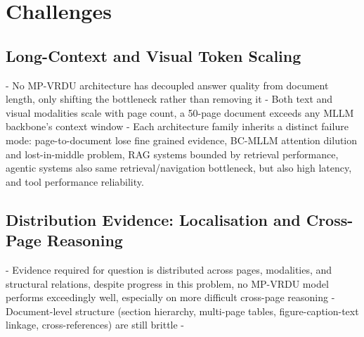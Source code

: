 \documentclass[11pt]{article}
\begin{document}





\section{Challenges}

\subsection{Long-Context and Visual Token Scaling}
- No MP-VRDU architecture has decoupled answer quality from document length, only shifting the bottleneck rather than removing it
- Both text and visual modalities scale with page count, a 50-page document exceeds any MLLM backbone's context window
- Each architecture family inherits a distinct failure mode: page-to-document lose fine grained evidence, BC-MLLM attention dilution and lost-in-middle problem, RAG systems bounded by retrieval performance, agentic systems also same retrieval/navigation bottleneck, but also high latency, and tool performance reliability.

\subsection{Distribution Evidence: Localisation and Cross-Page Reasoning}
- Evidence required for question is distributed across pages, modalities, and structural relations, despite progress in this problem, no MP-VRDU model performs exceedingly well, especially on more difficult cross-page reasoning
- Document-level structure (section hierarchy, multi-page tables, figure-caption-text linkage, cross-references) are still brittle
- 
\end{document}
